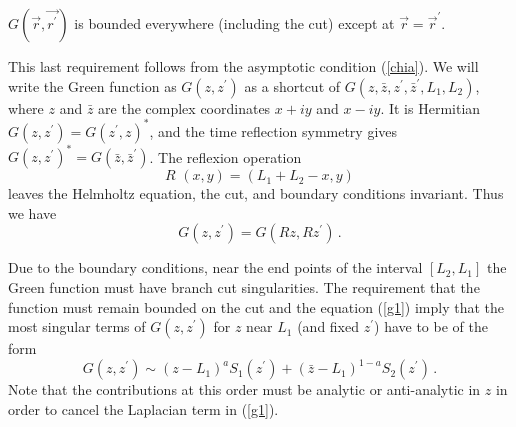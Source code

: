 \documentclass[11pt]{article}
\begin{document}
 $G(\vec{r},\vec{r^\prime})$ is bounded everywhere (including the cut) except at $\vec{r}=\vec{r}^{\prime}$.

\smallskip
\noindent This last requirement follows from the asymptotic condition (\ref{chia}).  
We will write the Green function as $G(z,z^{\prime})$ as a
shortcut of $G(z,\bar{z},z^{\prime},\bar{z}^{\prime},L_{1},L_{2})$,
where $z$ and $\bar{z}$ are the complex coordinates $x+iy$ and $x-iy$. 
It is Hermitian  $
G(z,z^{\prime})=G(z^{\prime},z)^{*}$, 
 and the time reflection symmetry gives $
G(z,z^{\prime})^{*}=G(\bar{z},\bar{z}^{\prime})$. 
 The
reflexion operation 
\begin{equation}
R\,\,(x,y)=(L_{1}+L_{2}-x,y) \label{refle}
\end{equation}
leaves the Helmholtz equation, the cut, and boundary conditions invariant. Thus we have 
\begin{equation}
G(z,z^{\prime})=G(Rz,Rz^{\prime})\,. \label{sime}
\end{equation}

Due to the boundary conditions, near the end points of the interval $[L_{2},L_{1}]$ the Green function must
have branch cut singularities. The requirement that
the function must remain bounded on the cut and the equation (\ref{g1})
imply that the most singular terms of $G(z,z^{\prime})$ for $z$ near $
L_{1}$ (and fixed $z^{\prime}$) have to be of the form
\begin{equation}
G(z,z^{\prime})\sim (z-L_{1})^{a }S_{1}(z^{\prime})+(\bar{z}
-L_{1})^{1-a }S_{2}(z^{\prime}) \,. \label{equ2}
\end{equation}
 Note that the contributions at this order must be  
analytic or anti-analytic in $z$ in
order to cancel the Laplacian term in (\ref{g1}).
\end{document}
